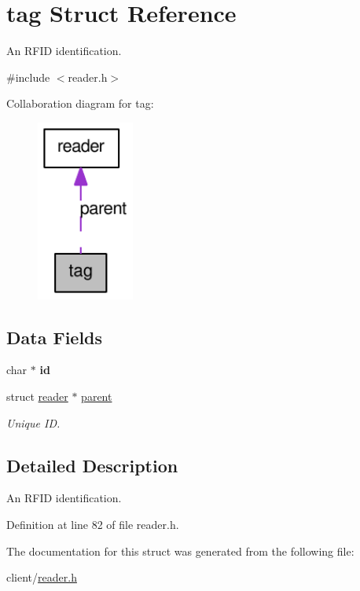 \hypertarget{structtag}{
\section{tag Struct Reference}
\label{structtag}
}


An RFID identification.  




{\ttfamily \#include $<$reader.h$>$}



Collaboration diagram for tag:\nopagebreak
\begin{figure}[H]
\begin{center}
\leavevmode
\includegraphics[width=91pt]{structtag__coll__graph}
\end{center}
\end{figure}
\subsection*{Data Fields}
\begin{DoxyCompactItemize}
\item 
\hypertarget{structtag_aecb3b0d045ada529257a2fbf8f829599}{
char $\ast$ {\bfseries id}}
\label{structtag_aecb3b0d045ada529257a2fbf8f829599}

\item 
\hypertarget{structtag_a049b05dbb9640019aa443230bdf84fa4}{
struct \hyperlink{structreader}{reader} $\ast$ \hyperlink{structtag_a049b05dbb9640019aa443230bdf84fa4}{parent}}
\label{structtag_a049b05dbb9640019aa443230bdf84fa4}

\begin{DoxyCompactList}\small\item\em Unique ID. \item\end{DoxyCompactList}\end{DoxyCompactItemize}


\subsection{Detailed Description}
An RFID identification. 

Definition at line 82 of file reader.h.



The documentation for this struct was generated from the following file:\begin{DoxyCompactItemize}
\item 
client/\hyperlink{reader_8h}{reader.h}\end{DoxyCompactItemize}
